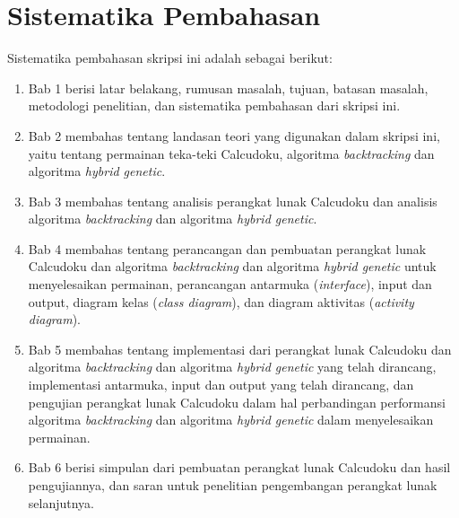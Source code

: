 \section{Sistematika Pembahasan}
\label{sec:sispem}
Sistematika pembahasan skripsi ini adalah sebagai berikut:
\begin{enumerate}
\item Bab 1 berisi latar belakang, rumusan masalah, tujuan, batasan masalah, metodologi penelitian, dan sistematika pembahasan dari skripsi ini.
\item Bab 2 membahas tentang landasan teori yang digunakan dalam skripsi ini, yaitu tentang permainan teka-teki Calcudoku, algoritma \textit{backtracking} dan algoritma \textit{hybrid genetic}.
\item Bab 3 membahas tentang analisis perangkat lunak Calcudoku dan analisis algoritma \textit{backtracking} dan algoritma \textit{hybrid genetic}.
\item Bab 4 membahas tentang perancangan dan pembuatan perangkat lunak Calcudoku dan algoritma \textit{backtracking} dan algoritma \textit{hybrid genetic} untuk menyelesaikan permainan, perancangan antarmuka (\textit{interface}), input dan output, diagram kelas (\textit{class diagram}), dan diagram aktivitas (\textit{activity diagram}).
\item Bab 5 membahas tentang implementasi dari perangkat lunak Calcudoku dan algoritma \textit{backtracking} dan algoritma \textit{hybrid genetic} yang telah dirancang, implementasi antarmuka, input dan output yang telah dirancang, dan pengujian perangkat lunak Calcudoku dalam hal perbandingan performansi algoritma \textit{backtracking} dan algoritma \textit{hybrid genetic} dalam menyelesaikan permainan.
\item Bab 6 berisi simpulan dari pembuatan perangkat lunak Calcudoku dan hasil pengujiannya, dan saran untuk penelitian pengembangan perangkat lunak selanjutnya.
\end{enumerate}